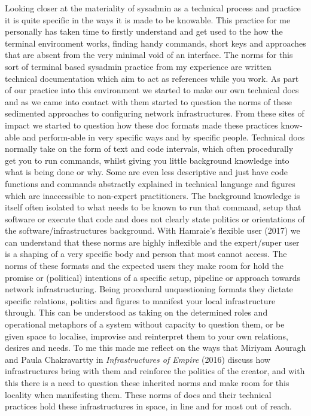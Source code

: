 Looking closer at the materiality of sysadmin as a technical process and
practice it is quite specific in the ways it is made to be knowable.
This practice for me personally has taken time to firstly understand and
get used to the how the terminal environment works, finding handy
commands, short keys and approaches that are absent from the very
minimal void of an interface. The norms for this sort of terminal based
sysadmin practice from my experience are written technical documentation
which aim to act as references while you work. As part of our practice
into this environment we started to make our own technical docs and as
we came into contact with them started to question the norms of these
sedimented approaches to configuring network infrastructures. From these
sites of impact we started to question how these doc formats made these
practices know-able and perform-able in very specific ways and by
specific people. Technical docs normally take on the form of text and
code intervals, which often procedurally get you to run commands, whilst
giving you little background knowledge into what is being done or why.
Some are even less descriptive and just have code functions and commands
abstractly explained in technical language and figures which are
inaccessible to non-expert practitioners. The background knowledge is
itself often isolated to what needs to be known to run that command,
setup that software or execute that code and does not clearly state
politics or orientations of the software/infrastructures background.
With Hamraie's flexible user (2017) we can understand that these norms
are highly inflexible and the expert/super user is a shaping of a very
specific body and person that most cannot access. The norms of these
formats and the expected users they make room for hold the promise or
(political) intentions of a specific setup, pipeline or approach towards
network infrastructuring. Being procedural unquestioning formats they
dictate specific relations, politics and figures to manifest your local
infrastructure through. This can be understood as taking on the
determined roles and operational metaphors of a system without capacity
to question them, or be given space to localise, improvise and
reinterpret them to your own relations, desires and needs. To me this
made me reflect on the ways that Miriyam Aouragh and Paula Chakravartty
in \emph{Infrastructures of Empire} (2016) discuss how infrastructures
bring with them and reinforce the politics of the creator, and with this
there is a need to question these inherited norms and make room for this
locality when manifesting them. These norms of docs and their technical
practices hold these infrastructures in space, in line and for most out
of reach.

